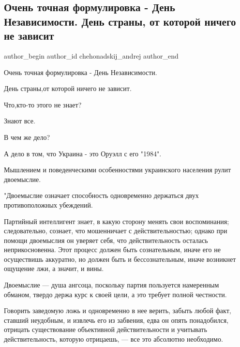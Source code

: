 
 
 
 
 
 
\subsection{Очень точная формулировка - День Независимости. День страны, от которой  ничего не зависит}
\label{sec:24_08_2021.fb.chehonadskij_andrej.1.strana_nezavisimost_formulirovka}
 
\ifcmt
 author_begin
   author_id chehonadskij_andrej
 author_end
\fi

Очень точная формулировка - День Независимости.

День страны,от которой  ничего не зависит.

Что,кто-то этого не знает?

Знают все.

В чем же дело?

А дело в том, что Украина - это Оруэлл с его "1984".

Мышлением и поведенческими особенностями украинского населения рулит
двоемыслие.

"Двоемыслие означает способность одновременно держаться двух противоположных
убеждений. 

Партийный интеллигент знает, в какую сторону менять свои воспоминания;
следовательно, сознает, что мошенничает с действительностью; однако при помощи
двоемыслия он уверяет себя, что действительность осталась неприкосновенна. Этот
процесс должен быть сознательным, иначе его не осуществишь аккуратно, но должен
быть и бессознательным, иначе возникнет ощущение лжи, а значит, и вины. 

Двоемыслие — душа ангсоца, поскольку партия пользуется намеренным обманом,
твердо держа курс к своей цели, а это требует полной честности. 

Говорить заведомую ложь и одновременно в нее верить, забыть любой факт, ставший
неудобным, и извлечь его из забвения, едва он опять понадобился, отрицать
существование объективной действительности и учитывать действительность,
которую отрицаешь, — все это абсолютно необходимо. 

